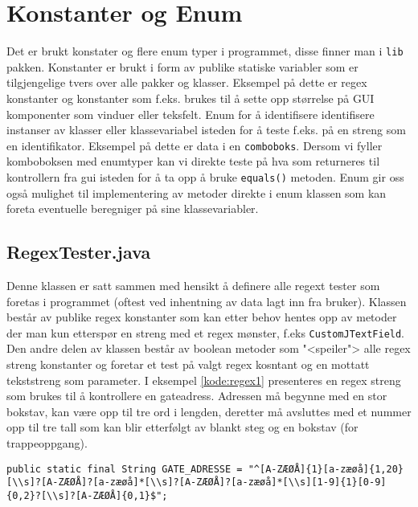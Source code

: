 \section{Konstanter og Enum}
Det er brukt konstater og flere enum typer i programmet, disse finner man i \texttt{lib} pakken. Konstanter er brukt i form av publike statiske variabler som er tilgjengelige tvers over alle pakker og klasser. Eksempel på dette er regex konstanter og konstanter som f.eks. brukes til å sette opp størrelse på GUI komponenter som vinduer eller teksfelt. 
Enum for å identifisere identifisere instanser av klasser eller klassevariabel isteden for å teste f.eks. på en streng som en identifikator. Eksempel på dette er data i en \texttt{comboboks}. Dersom vi fyller komboboksen med enumtyper kan vi direkte teste på hva som returneres til kontrollern fra gui isteden for å ta opp å bruke \texttt{equals()} metoden. 
Enum gir oss også mulighet til implementering av metoder direkte i enum klassen som kan foreta eventuelle beregniger på sine klassevariabler. 

\subsection{RegexTester.java} \label{subsec:regextest}
Denne klassen er satt sammen med hensikt å definere alle regext tester som foretas i programmet (oftest ved inhentning av data lagt inn fra bruker). 
Klassen består av publike regex konstanter som kan etter behov hentes opp av metoder der man kun etterspør en streng med et regex mønster, f.eks \texttt{CustomJTextField}.
Den andre delen av klassen består av boolean metoder som "<speiler"> alle regex streng konstanter og foretar et test på valgt regex kosntant og en mottatt tekststreng som parameter. 
I eksempel \ref{kode:regex1} presenteres en regex streng som brukes til å kontrollere en gateadress. Adressen må begynne med en stor bokstav, kan være opp til tre ord i lengden, deretter må avsluttes med et nummer opp til tre tall som kan blir etterfølgt av blankt steg og en bokstav (for trappeoppgang).

\begin{lstlisting}[caption=Regexstreng for gateadresse og husnummer.,label=kode:regex1]
	public static final String GATE_ADRESSE = "^[A-ZÆØÅ]{1}[a-zæøå]{1,20}[\\s]?[A-ZÆØÅ]?[a-zæøå]*[\\s]?[A-ZÆØÅ]?[a-zæøå]*[\\s][1-9]{1}[0-9]{0,2}?[\\s]?[A-ZÆØÅ]{0,1}$";
\end{lstlisting}


